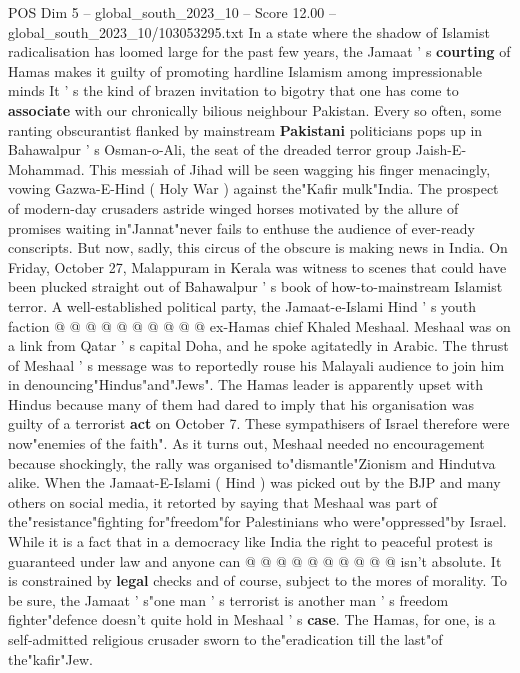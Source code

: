 \begin{textsample}{POS Dim 5 – global\_south\_2023\_10 – Score 12.00 – global\_south\_2023\_10/103053295.txt}  \label{ex:f5_pos_390}
In a state where the shadow of Islamist radicalisation has loomed large for the past few years, the Jamaat ' s \textbf{courting} of Hamas makes it guilty of promoting hardline Islamism among impressionable minds It ' s the kind of brazen invitation to bigotry that one has come to \textbf{associate} with our chronically bilious neighbour Pakistan.
Every so often, some ranting obscurantist flanked by mainstream \textbf{Pakistani} politicians pops up in Bahawalpur ' s Osman-o-Ali, the seat of the dreaded terror group Jaish-E-Mohammad.
This messiah of Jihad will be seen wagging his finger menacingly, vowing Gazwa-E-Hind ( Holy War ) against the"Kafir mulk"India.
The prospect of modern-day crusaders astride winged horses motivated by the allure of promises waiting in"Jannat"never fails to enthuse the audience of ever-ready conscripts.
But now, sadly, this circus of the obscure is making news in India.
On Friday, October 27, Malappuram in Kerala was witness to scenes that could have been plucked straight out of Bahawalpur ' s book of how-to-mainstream Islamist terror.
A well-established political party, the Jamaat-e-Islami Hind ' s youth faction @ @ @ @ @ @ @ @ @ @ ex-Hamas chief Khaled Meshaal.
Meshaal was on a link from Qatar ' s capital Doha, and he spoke agitatedly in Arabic.
The thrust of Meshaal ' s message was to reportedly rouse his Malayali audience to join him in denouncing"Hindus"and"Jews".
The Hamas leader is apparently upset with Hindus because many of them had dared to imply that his organisation was guilty of a terrorist \textbf{act} on October 7.
These sympathisers of Israel therefore were now"enemies of the faith".
As it turns out, Meshaal needed no encouragement because shockingly, the rally was organised to"dismantle"Zionism and Hindutva alike.
When the Jamaat-E-Islami ( Hind ) was picked out by the BJP and many others on social media, it retorted by saying that Meshaal was part of the"resistance"fighting for"freedom"for Palestinians who were"oppressed"by Israel.
While it is a fact that in a democracy like India the right to peaceful protest is guaranteed under law and anyone can @ @ @ @ @ @ @ @ @ @ isn't absolute.
It is constrained by \textbf{legal} checks and of course, subject to the mores of morality.
To be sure, the Jamaat ' s"one man ' s terrorist is another man ' s freedom fighter"defence doesn't quite hold in Meshaal ' s \textbf{case}.
The Hamas, for one, is a self-admitted religious crusader sworn to the"eradication till the last"of the"kafir"Jew.

\end{textsample}

